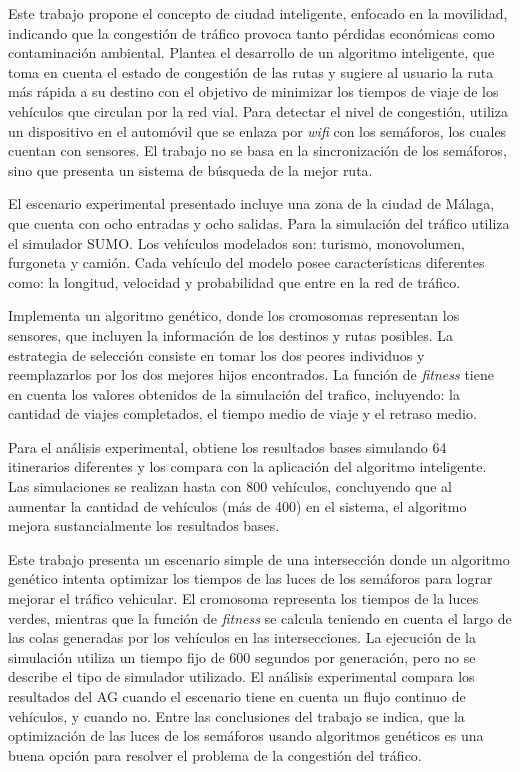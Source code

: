 \begin{itemize}
\begin{item}

Este trabajo propone el concepto de ciudad inteligente, enfocado en la movilidad, indicando que la congestión de tráfico provoca tanto pérdidas económicas como contaminación ambiental. Plantea el desarrollo de un algoritmo inteligente, que toma en cuenta el estado de congestión de las rutas y sugiere al usuario la ruta más rápida a su destino con el objetivo de minimizar los tiempos de viaje de los vehículos que circulan por la red vial. Para detectar el nivel de congestión, utiliza un dispositivo en el automóvil que se enlaza por \emph{wifi} con los semáforos, los cuales cuentan con sensores. El trabajo no se basa en la sincronización de los semáforos, sino que presenta un sistema de búsqueda de la mejor ruta.

El escenario experimental presentado incluye una zona de la ciudad de Málaga, que cuenta con ocho entradas y ocho salidas. Para la simulación del tráfico utiliza el simulador SUMO. Los vehículos modelados son: turismo, monovolumen, furgoneta y camión. Cada vehículo del modelo posee características diferentes como: la longitud, velocidad y probabilidad que entre en la red de tráfico.

 Implementa un algoritmo genético, donde los cromosomas representan los sensores, que incluyen la información de los destinos y rutas posibles. La estrategia de selección consiste en tomar los dos peores individuos y reemplazarlos por los dos mejores hijos encontrados. La función de \emph{fitness} tiene en cuenta los valores obtenidos de la simulación del trafico, incluyendo: la cantidad de viajes completados, el tiempo medio de viaje y el retraso medio. 

Para el análisis experimental, obtiene los resultados bases simulando 64 itinerarios diferentes y los compara con la aplicación del algoritmo inteligente. Las simulaciones se realizan hasta con 800 vehículos, concluyendo que al aumentar la cantidad de vehículos (más de 400) en el sistema, el algoritmo mejora sustancialmente los resultados bases.

\end{item}	


\begin{item}

Este trabajo presenta un escenario simple de una intersección donde un algoritmo genético intenta optimizar los tiempos de las luces de los semáforos para lograr mejorar el tráfico vehicular. El cromosoma representa los tiempos de la luces verdes, mientras que la función de \emph{fitness} se calcula teniendo en cuenta el largo de las colas generadas por los vehículos en las intersecciones. La ejecución de la simulación utiliza un tiempo fijo de 600 segundos por generación, pero no se describe el tipo de simulador utilizado. El análisis experimental compara los resultados del AG cuando el escenario tiene en cuenta un flujo continuo de vehículos, y cuando no. Entre las conclusiones del trabajo se indica, que la optimización de las luces de los semáforos usando algoritmos genéticos es una buena opción para resolver el problema de la congestión del tráfico.	
\end{item}	



\end{itemize}
